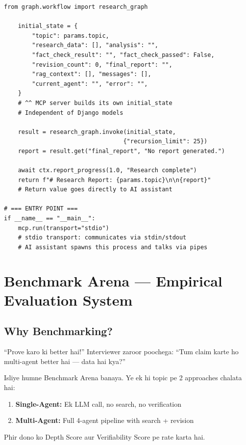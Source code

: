 \documentclass[11pt,a4paper,twoside]{report}
\begin{document}
\begin{lstlisting}[style=pythonstyle,caption={mcp\_server.py --- Server Setup}]
    from graph.workflow import research_graph

    initial_state = {
        "topic": params.topic,
        "research_data": [], "analysis": "",
        "fact_check_result": "", "fact_check_passed": False,
        "revision_count": 0, "final_report": "",
        "rag_context": [], "messages": [],
        "current_agent": "", "error": "",
    }
    # ^^ MCP server builds its own initial_state
    # Independent of Django models

    result = research_graph.invoke(initial_state,
                                  {"recursion_limit": 25})
    report = result.get("final_report", "No report generated.")

    await ctx.report_progress(1.0, "Research complete")
    return f"# Research Report: {params.topic}\n\n{report}"
    # Return value goes directly to AI assistant

# === ENTRY POINT ===
if __name__ == "__main__":
    mcp.run(transport="stdio")
    # stdio transport: communicates via stdin/stdout
    # AI assistant spawns this process and talks via pipes
\end{lstlisting}



\chapter{Benchmark Arena --- Empirical Evaluation System}

\section{Why Benchmarking?}

\begin{storybox}{``Prove karo ki better hai!''}
Interviewer zaroor poochega: ``Tum claim karte ho multi-agent better hai --- data hai kya?''

Isliye humne Benchmark Arena banaya. Ye ek hi topic pe 2 approaches chalata hai:
\begin{enumerate}
    \item \textbf{Single-Agent:} Ek LLM call, no search, no verification
    \item \textbf{Multi-Agent:} Full 4-agent pipeline with search + revision
\end{enumerate}
Phir dono ko Depth Score aur Verifiability Score pe rate karta hai.
\end{storybox}
\end{document}
